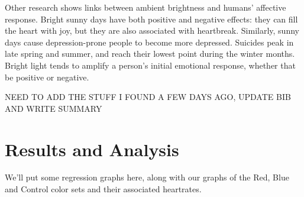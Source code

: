 \documentclass[11pt]{article}
\begin{document}
Other research shows links between ambient brightness and humans' affective response. Bright sunny days have both positive and negative effects: they can fill the heart with joy, but they are also associated with heartbreak. \cite{kevan} Similarly, sunny days cause depression-prone people to become more depressed. Suicides peak in late spring and summer, and reach their lowest point during the winter months. Bright light tends to amplify a person's initial emotional response, whether that be positive or negative.\cite{xu} 

NEED TO ADD THE STUFF I FOUND A FEW DAYS AGO, UPDATE BIB AND WRITE SUMMARY

\section{Results and Analysis}
We'll put some regression graphs here, along with our graphs of the Red, Blue and Control color sets and their associated heartrates.

\newpage 
{}


\end{document}
